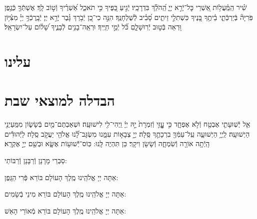 \documentclass[twoside, openany, parskip=half, 11pt]{book}
\begin{document}
\sepline


שִׁ֗יר הַֽמַּֽ֫עֲל֥וֹת אַ֭שְׁרֵי כׇּל־יְֿרֵ֣א יְיָ֑ הַֽ֝הֹלֵ֗ךְ בִּדְרָכָֽיו׃
יְֿגִ֣יעַ כַּ֭פֶּיךָ כִּ֣י תֹאכֵ֑ל אַ֝שְׁרֶ֗יךָ וְֿט֣וֹב לָֽךְ׃
אֶשְׁתְּֿךָ֤ כְּֿגֶ֥פֶן פֹּֽרִיָּה֘ בְּֿיַרְכְּֿתֵ֢י בֵ֫יתֶ֥ךָ בָּ֭נֶיךָ כִּשְׁתִלֵ֣י זֵיתִ֑ים סָ֝בִ֗יב לְֿשֻׁלְחָנֶֽךָ׃
הִנֵּ֣ה כִי־כֵ֭ן יְֿבֹ֥רַךְ גָּ֗בֶר יְֿרֵ֣א יְיָ׃
יְֿבָֽרֶכְֿךָ֥ יְיָ֗ מִצִּ֫יּ֥וֹן וּ֭רְאֵה בְּֿט֣וּב יְֿרֽוּשָׁלָ֑םִ כֹּ֝֗ל יְֿמֵ֣י חַיֶּֽיךָ׃
וּרְאֵֽה־בָנִ֥ים לְֿבָנֶ֑יךָ שָׁ֝ל֗וֹם עַל־יִשְׂרָאֵֽל׃


\label{matzash_alienu}
\fullkaddish


\section*{ עלינו }


\aleinu

\vfill

\quad{}\quad{}

\clearpage

\section[הבדלה]{ הבדלה למוצאי שבת } \label{havdala}

%
%


אֵ֧ל יְֿשֽׁוּעָתִ֛י אֶבְטַ֖ח וְֿלֹ֣א אֶפְחָ֑ד כִּ֣י עׇׇׇׇׇׇָזִּ֤י וְֿזִמְרָת֙ יָ֣הּ יְיָ֔ וַֽיְהִי־לִ֖י לִישׁוּעָֽה׃ וּשְׁאַבְתֶּם־מַ֖יִם בְּֿשָׂשׂ֑וֹן מִמַּֽעַיְנֵ֖י הַיְשׁוּעָֽה׃
לַֽיְיָ֥ הַיְשׁוּעָ֑ה עַֽל־עַמְּֿךָ֖ בִרְכָתֶ֣ךָ סֶּֽלָה׃
יְיָ֣ צְבָא֣וֹת עִמָּ֑נוּ מִשְׂגָּב־לָ֝֗נוּ אֱלֹהֵ֖י יַעֲקֹ֣ב סֶֽלָה׃
לַיְּֿהוּדִ֕ים הָֽיְֿתָ֥ה אוֹרָ֖ה וְֿשִׂמְחָ֑ה וְֿשָׂשׂ֖ן וִיקָֽר׃ כֵּן תִּהְיֶה לָּֽנוּ: כּֽוֹס־יְֿֿשׁוּע֥וֹת אֶשָּׂ֑א וּבְשֵׁ֖ם יְיָ֣ אֶקְרָֽא׃


\begin{scriptsize}
סַבְרֵי מָרָנָן וְֿרַבָּנָן וְֿרַבּוֹתַי: \\
\end{scriptsize}
אַתָּה יְיָ אֱלֹהֵֽינוּ מֶֽלֶךְ הָעוֹלָם בּוֹרֵא פְּֿרִי הַגָּֽפֶן:

אַתָּה יְיָ אֱלֹהֵֽינוּ מֶֽלֶךְ הָעוֹלָם בּוֹרֵא מִינֵי בְֿשָׂמִים:

אַתָּה יְיָ אֱלֹהֵֽינוּ מֶֽלֶךְ הָעוֹלָם בּוֹרֵא מְֿאוֹרֵי הָאֵשׁ:
\end{document}
